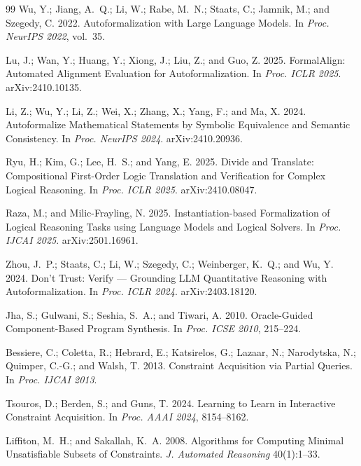 \documentclass[letterpaper]{article}
\begin{document}
\begin{thebibliography}{99}
Wu, Y.; Jiang, A.~Q.; Li, W.; Rabe, M.~N.; Staats, C.; Jamnik, M.; and
Szegedy, C. 2022.
Autoformalization with Large Language Models.
In \textit{Proc. NeurIPS 2022}, vol.~35.

Lu, J.; Wan, Y.; Huang, Y.; Xiong, J.; Liu, Z.; and Guo, Z. 2025.
FormalAlign: Automated Alignment Evaluation for Autoformalization.
In \textit{Proc. ICLR 2025}. arXiv:2410.10135.

Li, Z.; Wu, Y.; Li, Z.; Wei, X.; Zhang, X.; Yang, F.; and Ma, X. 2024.
Autoformalize Mathematical Statements by Symbolic Equivalence and
Semantic Consistency. In \textit{Proc. NeurIPS 2024}. arXiv:2410.20936.

Ryu, H.; Kim, G.; Lee, H.~S.; and Yang, E. 2025.
Divide and Translate: Compositional First-Order Logic Translation and
Verification for Complex Logical Reasoning.
In \textit{Proc. ICLR 2025}. arXiv:2410.08047.

Raza, M.; and Milic-Frayling, N. 2025.
Instantiation-based Formalization of Logical Reasoning Tasks using
Language Models and Logical Solvers.
In \textit{Proc. IJCAI 2025}. arXiv:2501.16961.

Zhou, J.~P.; Staats, C.; Li, W.; Szegedy, C.; Weinberger, K.~Q.; and
Wu, Y. 2024.
Don't Trust: Verify --- Grounding LLM Quantitative Reasoning with
Autoformalization. In \textit{Proc. ICLR 2024}. arXiv:2403.18120.

Jha, S.; Gulwani, S.; Seshia, S.~A.; and Tiwari, A. 2010.
Oracle-Guided Component-Based Program Synthesis.
In \textit{Proc. ICSE 2010}, 215--224.

Bessiere, C.; Coletta, R.; Hebrard, E.; Katsirelos, G.; Lazaar, N.; Narodytska, N.; Quimper, C.-G.; and Walsh, T. 2013.
Constraint Acquisition via Partial Queries.
In \textit{Proc. IJCAI 2013}.

Tsouros, D.; Berden, S.; and Guns, T. 2024.
Learning to Learn in Interactive Constraint Acquisition.
In \textit{Proc. AAAI 2024}, 8154--8162.

Liffiton, M.~H.; and Sakallah, K.~A. 2008. Algorithms for Computing Minimal
Unsatisfiable Subsets of Constraints. \textit{J. Automated Reasoning} 40(1):1--33.


\end{thebibliography}
\end{document}
